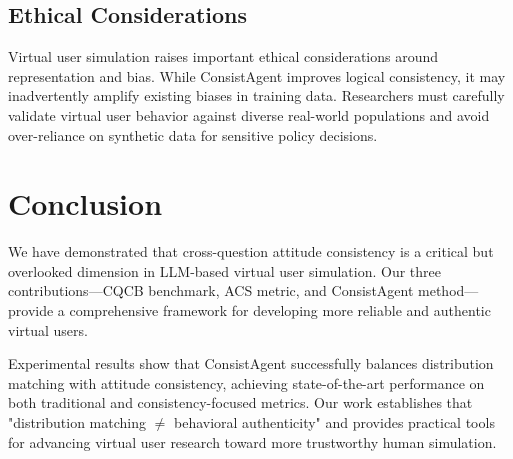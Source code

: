 \documentclass[sigconf, anonymous]{acmart}
\begin{document}
\subsection{Ethical Considerations}

Virtual user simulation raises important ethical considerations around representation and bias. While ConsistAgent improves logical consistency, it may inadvertently amplify existing biases in training data. Researchers must carefully validate virtual user behavior against diverse real-world populations and avoid over-reliance on synthetic data for sensitive policy decisions.

\section{Conclusion}

We have demonstrated that cross-question attitude consistency is a critical but overlooked dimension in LLM-based virtual user simulation. Our three contributions—CQCB benchmark, ACS metric, and ConsistAgent method—provide a comprehensive framework for developing more reliable and authentic virtual users.

Experimental results show that ConsistAgent successfully balances distribution matching with attitude consistency, achieving state-of-the-art performance on both traditional and consistency-focused metrics. Our work establishes that "distribution matching $\neq$ behavioral authenticity" and provides practical tools for advancing virtual user research toward more trustworthy human simulation.



\end{document}
